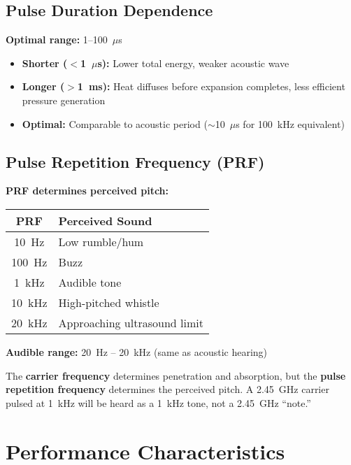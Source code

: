 \subsection{Pulse Duration Dependence}

\textbf{Optimal range:} 1--100~$\mu$s

\begin{itemize}
\item \textbf{Shorter ($<$1~$\mu$s):} Lower total energy, weaker acoustic wave
\item \textbf{Longer ($>$1~ms):} Heat diffuses before expansion completes, less efficient pressure generation
\item \textbf{Optimal:} Comparable to acoustic period ($\sim$10~$\mu$s for 100~kHz equivalent)
\end{itemize}

\subsection{Pulse Repetition Frequency (PRF)}

\textbf{PRF determines perceived pitch:}

\begin{center}
\begin{tabular}{@{}cl@{}}
\toprule
\textbf{PRF} & \textbf{Perceived Sound} \\
\midrule
10~Hz & Low rumble/hum \\
100~Hz & Buzz \\
1~kHz & Audible tone \\
10~kHz & High-pitched whistle \\
20~kHz & Approaching ultrasound limit \\
\bottomrule
\end{tabular}
\end{center}

\textbf{Audible range:} 20~Hz -- 20~kHz (same as acoustic hearing)

\begin{keyconcept}
The \textbf{carrier frequency} determines penetration and absorption, but the \textbf{pulse repetition frequency} determines the perceived pitch. A 2.45~GHz carrier pulsed at 1~kHz will be heard as a 1~kHz tone, not a 2.45~GHz ``note.''
\end{keyconcept}

\section{Performance Characteristics}

